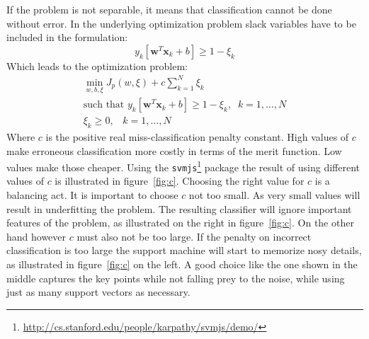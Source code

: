 If the problem is not separable, it means that classification cannot be done without error. In the underlying optimization problem slack variables have to be included in the formulation:
\begin{equation}
y_k [\mathbf{w}^T \mathbf{x}_k + b] \geq 1 - \xi_k
\end{equation}
Which leads to the optimization problem:
\begin{align}
\min_{w,b,\xi} J_p(w,\xi) + c \sum_{k = 1}^N \xi_k \\
\text{such that }   y_k [\mathbf{w}^T \mathbf{x}_k + b] \geq 1 - \xi_k, \;\; k = 1,\dots,N \\
\xi_k \geq 0, \;\;\; k = 1,\dots,N 
\end{align}
Where $c$ is the positive real miss-classification penalty constant. High values of $c$ make erroneous classification more costly in terms of the merit function.  Low values make those cheaper. Using the \texttt{svmjs}\footnote{\url{http://cs.stanford.edu/people/karpathy/svmjs/demo/}} package the result of using different values of $c$ is illustrated in figure~\ref{fig:c}. Choosing the right value for $c$ is a balancing act. It is important to choose $c$ not too small. As very small values will result in underfitting the problem. The resulting classifier will ignore important features of the problem, as illustrated on the right in figure~\ref{fig:c}. On the other hand however $c$ must also not be too large. If the penalty on incorrect classification is too large the support machine will start to memorize nosy details, as illustrated in figure~\ref{fig:c} on the left. A good choice like the one shown in the middle captures the key points while not falling prey to the noise, while using just as many support vectors as necessary. 
